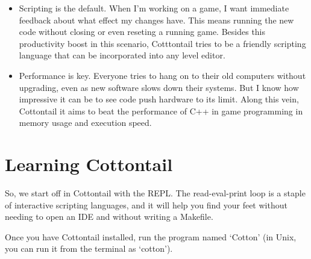 \begin{itemize}
\item Scripting is the default. When I'm working on a game, I want
immediate feedback about what effect my changes have. This means
running the new code without closing or even reseting a running game.
Besides this productivity boost in this scenario, Cotttontail tries to
be a friendly scripting language that can be incorporated into any
level editor.

\item Performance is key. Everyone tries to hang on to their old
computers without upgrading, even as new software slows down their
systems. But I know how impressive it can be to see code push hardware
to its limit. Along this vein, Cottontail it aims to beat the
performance of C++ in game programming in memory usage and execution
speed.

\end{itemize}

\section{Learning Cottontail}

So, we start off in Cottontail with the REPL. The read-eval-print loop
is a staple of interactive scripting languages, and it will help you
find your feet without needing to open an IDE and without writing a
Makefile.

Once you have Cottontail installed, run the program named `Cotton'
(in Unix, you can run it from the terminal as `cotton').




